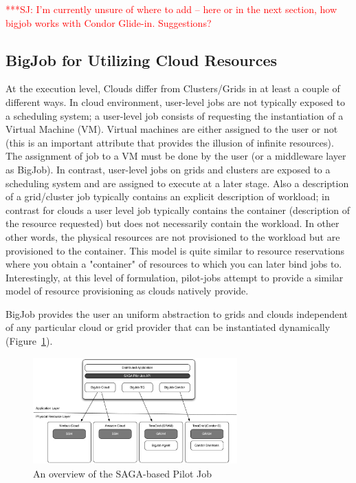 \documentclass[conference,final]{IEEEtran}
\newcommand{\jhanote}[1]{ {\textcolor{red} { ***SJ: #1 }}}
\newcommand{\jhanote}[1]{}
\begin{document}
\jhanote{I'm currently unsure of where to add -- here or in the next
  section, how bigjob works with Condor Glide-in. Suggestions?}

\subsection{BigJob for Utilizing Cloud Resources}


At the execution level, Clouds differ from Clusters/Grids in at least
a couple of different ways. In cloud environment, user-level jobs are
not typically exposed to a scheduling system; a user-level job
consists of requesting the instantiation of a Virtual Machine (VM).
Virtual machines are either assigned to the user or not (this is an
important attribute that provides the illusion of infinite resources).
The assignment of job to a VM must be done by the user (or a
middleware layer as BigJob).  In contrast, user-level jobs on grids
and clusters are exposed to a scheduling system and are assigned to
execute at a later stage.  Also a description of a grid/cluster job
typically contains an explicit description of workload; in contrast
for clouds a user level job typically contains the container
(description of the resource requested) but does not necessarily
contain the workload. In other other words, the physical resources are
not provisioned to the workload but are provisioned to the container.
This model is quite similar to resource reservations where you obtain
a "container" of resources to which you can later bind jobs
to. Interestingly, at this level of formulation, pilot-jobs attempt to
provide a similar model of resource provisioning as clouds natively
provide.

BigJob provides the user an uniform abstraction to grids and clouds
independent of any particular cloud or grid provider that can be
instantiated dynamically
(Figure~\ref{fig:figures_distributed_pilot_job}).

\begin{figure}[htbp]
    \centering
        \includegraphics[width=0.7\textwidth]{figures/distributed_pilot_job.pdf}
    \caption{An overview of the SAGA-based Pilot Job}
    \label{fig:figures_distributed_pilot_job}
\end{figure}
\end{document}
